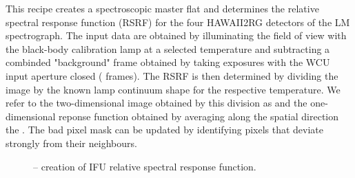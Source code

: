 This recipe creates a spectroscopic master flat and determines the
relative spectral response function (RSRF) for the four HAWAII2RG
detectors of the LM spectrograph. The input data are obtained by
illuminating the field of view with the black-body calibration lamp at
a selected temperature and subtracting a combinded "background" frame obtained
by taking exposures with the \ac{WCU} input aperture closed (
frames).
The RSRF is then determined by dividing the image by the known lamp continuum
shape for the respective temperature. We refer to the two-dimensional image
obtained by this division as  and the one-dimensional reponse
function obtained by averaging along the spatial direction the
. The bad pixel mask can be updated by identifying pixels
that deviate strongly from their neighbours.



\begin{figure}[hb]
    \centering
    \def \globalscale {0.700000}
    \fontsize{10}{12}\selectfont
    
  \caption[Recipe: ]{ --
    creation of IFU relative spectral response function.}
  \label{fig:metis_ifu_rsrf}
\end{figure}


